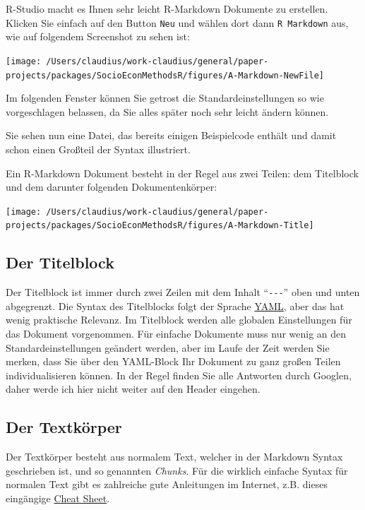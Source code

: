 \documentclass[]{tufte-book}
\begin{document}
R-Studio macht es Ihnen sehr leicht R-Markdown Dokumente zu erstellen.
Klicken Sie einfach auf den Button \texttt{Neu} und wählen dort dann
\texttt{R\ Markdown} aus, wie auf folgendem Screenshot zu sehen ist:

\begin{center}\texttt{[image: /Users/claudius/work-claudius/general/paper-projects/packages/SocioEconMethodsR/figures/A-Markdown-NewFile]} \end{center}

Im folgenden Fenster können Sie getrost die Standardeinstellungen so wie
vorgeschlagen belassen, da Sie alles später noch sehr leicht ändern
können.

Sie sehen nun eine Datei, das bereits einigen Beispielcode enthält und
damit schon einen Großteil der Syntax illustriert.

Ein R-Markdown Dokument besteht in der Regel aus zwei Teilen: dem
Titelblock und dem darunter folgenden Dokumentenkörper:

\begin{center}\texttt{[image: /Users/claudius/work-claudius/general/paper-projects/packages/SocioEconMethodsR/figures/A-Markdown-Title]} \end{center}

\subsection{Der Titelblock}\label{der-titelblock}

Der Titelblock ist immer durch zwei Zeilen mit dem Inhalt
``\texttt{-\/-\/-}'' oben und unten abgegrenzt. Die Syntax des
Titelblocks folgt der Sprache
\href{https://de.wikipedia.org/wiki/YAML}{YAML}, aber das hat wenig
praktische Relevanz. Im Titelblock werden alle globalen Einstellungen
für das Dokument vorgenommen. Für einfache Dokumente muss nur wenig an
den Standardeinstellungen geändert werden, aber im Laufe der Zeit werden
Sie merken, dass Sie über den YAML-Block Ihr Dokument zu ganz großen
Teilen individualisieren können. In der Regel finden Sie alle Antworten
durch Googlen, daher werde ich hier nicht weiter auf den Header
eingehen.

\subsection{Der Textkörper}\label{der-textkorper}

Der Textkörper besteht aus normalem Text, welcher in der Markdown Syntax
geschrieben ist, und so genannten \emph{Chunks}. Für die wirklich
einfache Syntax für normalen Text gibt es zahlreiche gute Anleitungen im
Internet, z.B. dieses eingängige
\href{https://rstudio.com/wp-content/uploads/2016/03/rmarkdown-cheatsheet-2.0.pdf}{Cheat
Sheet}.
\end{document}

